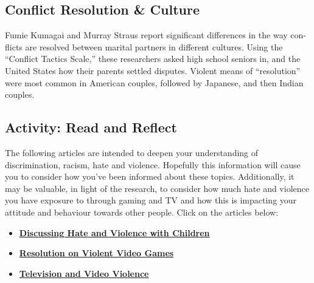 \documentclass[
]{book}
\providecommand{\tightlist}{%
  \setlength{\itemsep}{0pt}\setlength{\parskip}{0pt}}
\begin{document}
\hypertarget{conflict-resolution-culture}{%
\subsection*{Conflict Resolution \& Culture}\label{conflict-resolution-culture}}

Fumie Kumagai and Murray Straus report significant differences in the way con­flicts are resolved between marital partners in different cultures. Using the ``Conflict Tactics Scale,'' these researchers asked high school seniors in, and the United States how their parents settled disputes. Violent means of ``resolution'' were most common in American couples, followed by Japanese, and then Indian couples.

\hypertarget{activity-read-and-reflect-10}{%
\subsection*{Activity: Read and Reflect}\label{activity-read-and-reflect-10}}

\begin{reflect}
The following articles are intended to deepen your understanding of discrimination, racism, hate and violence. Hopefully this information will cause you to consider how you've been informed about these topics. Additionally, it may be valuable, in light of the research, to consider how much hate and violence you have exposure to through gaming and TV and how this is impacting your attitude and behaviour towards other people. Click on the articles below:

\begin{itemize}
\tightlist
\item
  \href{https://www.adl.org/education/resources/tools-and-strategies/discussing-hate-and-violence-with-children}{\textbf{Discussing Hate and Violence with Children}}\\
\item
  \href{https://www.apa.org/about/policy/violent-video-games}{\textbf{Resolution on Violent Video Games}}\\
\item
  \href{https://www.apa.org/action/resources/research-in-action/protect}{\textbf{Television and Video Violence}}
\end{itemize}
\end{reflect}
\end{document}
